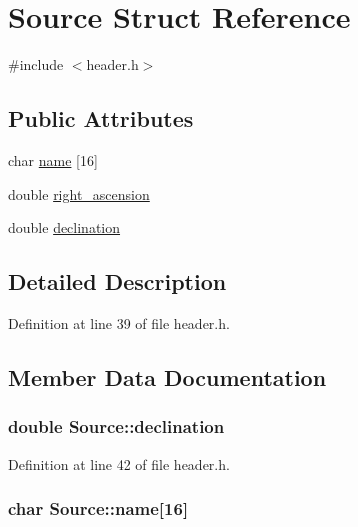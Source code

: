 \hypertarget{structSource}{
\section{Source Struct Reference}
\label{structSource}
}


{\ttfamily \#include $<$header.h$>$}\subsection*{Public Attributes}
\begin{DoxyCompactItemize}
\item 
char \hyperlink{structSource_a162170695feb3c21196dae54895af46a}{name} \mbox{[}16\mbox{]}
\item 
double \hyperlink{structSource_a3378987660510b2ab4f02db5aa81791e}{right\_\-ascension}
\item 
double \hyperlink{structSource_acd65dbd79034b6bd27ce7bea9cddf80b}{declination}
\end{DoxyCompactItemize}


\subsection{Detailed Description}


Definition at line 39 of file header.h.

\subsection{Member Data Documentation}
\hypertarget{structSource_acd65dbd79034b6bd27ce7bea9cddf80b}{
\subsubsection[{declination}]{\setlength{\rightskip}{0pt plus 5cm}double {\bf Source::declination}}}
\label{structSource_acd65dbd79034b6bd27ce7bea9cddf80b}


Definition at line 42 of file header.h.\hypertarget{structSource_a162170695feb3c21196dae54895af46a}{
\subsubsection[{name}]{\setlength{\rightskip}{0pt plus 5cm}char {\bf Source::name}\mbox{[}16\mbox{]}}}
\label{structSource_a162170695feb3c21196dae54895af46a}


